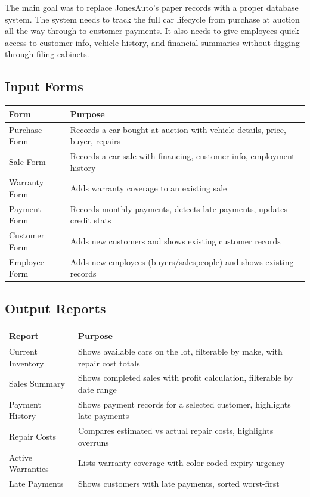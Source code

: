 \documentclass[12pt]{article}
\begin{document}
The main goal was to replace JonesAuto's paper records with a proper database system. The system needs to track the full car lifecycle from purchase at auction all the way through to customer payments. It also needs to give employees quick access to customer info, vehicle history, and financial summaries without digging through filing cabinets.

\subsection{Input Forms}

\begin{tabular}{ll}
\toprule
\textbf{Form} & \textbf{Purpose} \\
\midrule
Purchase Form & Records a car bought at auction with vehicle details, price, buyer, repairs \\
Sale Form & Records a car sale with financing, customer info, employment history \\
Warranty Form & Adds warranty coverage to an existing sale \\
Payment Form & Records monthly payments, detects late payments, updates credit stats \\
Customer Form & Adds new customers and shows existing customer records \\
Employee Form & Adds new employees (buyers/salespeople) and shows existing records \\
\bottomrule
\end{tabular}

\subsection{Output Reports}

\begin{tabular}{ll}
\toprule
\textbf{Report} & \textbf{Purpose} \\
\midrule
Current Inventory & Shows available cars on the lot, filterable by make, with repair cost totals \\
Sales Summary & Shows completed sales with profit calculation, filterable by date range \\
Payment History & Shows payment records for a selected customer, highlights late payments \\
Repair Costs & Compares estimated vs actual repair costs, highlights overruns \\
Active Warranties & Lists warranty coverage with color-coded expiry urgency \\
Late Payments & Shows customers with late payments, sorted worst-first \\
\bottomrule
\end{tabular}
\end{document}
